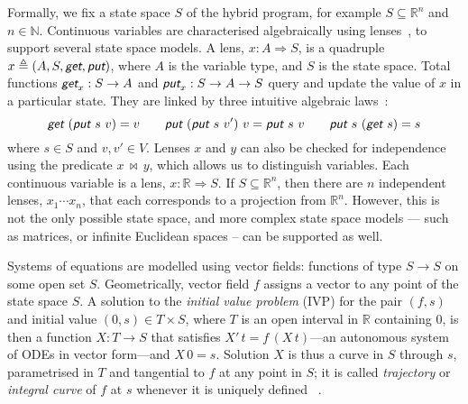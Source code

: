 \documentclass[envcountsame,envcountsect]{llncs}
\newcommand{\reals}{\mathbb{R}}
\newcommand{\defs}{\triangleq}
\newcommand{\lput}{\textit{\textsf{put}}}
\newcommand{\lget}{\textit{\textsf{get}}}
\newcommand{\lto}{\Longrightarrow}
\newcommand{\lindep}{\mathop{\,\bowtie\,}}
\begin{document}
Formally, we fix a state space $S$ of the hybrid program, for example
$S\subseteq \reals^n$ and $n\in\mathbb{N}$. Continuous variables are
characterised algebraically using lenses~\cite{FosterZW16}, to support
several state space models. A lens, $x : A \lto S$, is a quadruple
$x \defs (A, S, \lget, \lput)$, where $A$ is the variable type, and
$S$ is the state space. Total functions $\lget_x : S \to A$ and
$\lput_x : S \to A \to S$ query and update the value of $x$ in a
particular state. They are linked by three intuitive
algebraic laws~\cite{FosterZW16}: 
$$\lget~(\lput~s~v) = v \qquad \lput~(\lput~s~v')~v = \lput~s~v \qquad \lput~s~(\lget~s) = s$$
where $s \in S$ and $v, v' \in V$. Lenses $x$ and $y$ can also be
checked for independence using the predicate $x \lindep y$, which
allows us to distinguish variables. Each continuous variable is a
lens, $x : \reals \lto S$. If $S \subseteq \reals^n$, then there are
$n$ independent lenses, $x_1 \cdots x_n$, that each corresponds to a
projection from $\reals^n$. However, this is not the only possible
state space, and more complex state space models --- such as matrices,
or infinite Euclidean spaces -- can be supported as well.

Systems of equations are modelled using vector fields: functions of
type $S\to S$ on some open set $S$. Geometrically, vector field $f$
assigns a vector to any point of the state space $S$. A solution to
the \emph{initial value problem} (IVP) for the pair $(f,s)$ and
initial value $(0,s)\in T\times S$, where $T$ is an open interval in
$\reals$ containing $0$, is then a function $X:T\to S$ that satisfies
$X'\, t = f\, (X\, t)$---an autonomous system of ODEs in vector
form---and $X\, 0 = s$. Solution $X$ is thus a curve in $S$ through
$s$, parametrised in $T$ and tangential to $f$ at any point in $S$; it
is called \emph{trajectory} or \emph{integral curve} of $f$ at $s$
whenever it is uniquely defined ~\cite{Teschl12}.
\end{document}
